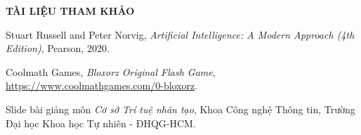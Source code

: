 \newpage
\thispagestyle{empty}

\begin{center}
    {\Large\bfseries\color{central_blue} TÀI LIỆU THAM KHẢO}
\end{center}


\begin{enumerate}[label={[{\arabic*}]}]
    \item Stuart Russell and Peter Norvig, \textit{Artificial Intelligence: A Modern Approach (4th Edition)}, Pearson, 2020.
    \item Coolmath Games, \textit{Bloxorz Original Flash Game}, \url{https://www.coolmathgames.com/0-bloxorz}.
    \item Slide bài giảng môn \textit{Cơ sở Trí tuệ nhân tạo}, Khoa Công nghệ Thông tin, Trường Đại học Khoa học Tự nhiên - ĐHQG-HCM.
\end{enumerate}
